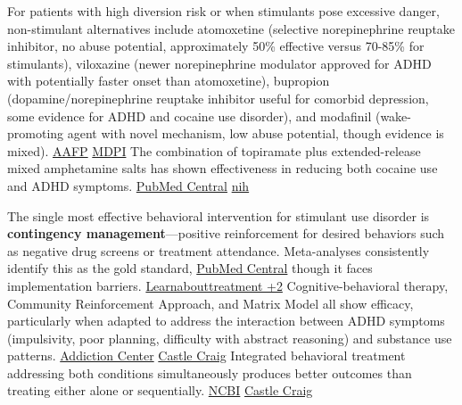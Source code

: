 For patients with high diversion risk or when stimulants pose excessive danger, non-stimulant alternatives include atomoxetine (selective norepinephrine reuptake inhibitor, no abuse potential, approximately 50\% effective versus 70-85\% for stimulants), viloxazine (newer norepinephrine modulator approved for ADHD with potentially faster onset than atomoxetine), bupropion (dopamine/norepinephrine reuptake inhibitor useful for comorbid depression, some evidence for ADHD and cocaine use disorder), and modafinil (wake-promoting agent with novel mechanism, low abuse potential, though evidence is mixed). \href{https://www.aafp.org/family-physician/patient-care/prevention-wellness/emotional-wellbeing/adhd-toolkit/treatment-and-management.html}{AAFP} \href{https://www.mdpi.com/2077-0383/12/9/3096}{MDPI} The combination of topiramate plus extended-release mixed amphetamine salts has shown effectiveness in reducing both cocaine use and ADHD symptoms. \href{https://pmc.ncbi.nlm.nih.gov/articles/PMC2676785/}{PubMed Central} \href{https://pmc.ncbi.nlm.nih.gov/articles/PMC4227391/}{nih}

The single most effective behavioral intervention for stimulant use disorder is \textbf{contingency management}---positive reinforcement for desired behaviors such as negative drug screens or treatment attendance. Meta-analyses consistently identify this as the gold standard, \href{https://pmc.ncbi.nlm.nih.gov/articles/PMC7302911/}{PubMed Central} though it faces implementation barriers. \href{https://www.learnabouttreatment.org/treatment/treatment-for-stimulant-use-disorder/}{Learnabouttreatment +2} Cognitive-behavioral therapy, Community Reinforcement Approach, and Matrix Model all show efficacy, particularly when adapted to address the interaction between ADHD symptoms (impulsivity, poor planning, difficulty with abstract reasoning) and substance use patterns. \href{https://www.addictioncenter.com/dual-diagnosis/adhd/}{Addiction Center} \href{https://www.castlecraig.co.uk/dual-diagnosis/adhd/}{Castle Craig} Integrated behavioral treatment addressing both conditions simultaneously produces better outcomes than treating either alone or sequentially. \href{https://www.ncbi.nlm.nih.gov/books/NBK601490/}{NCBI} \href{https://www.castlecraig.co.uk/dual-diagnosis/adhd/}{Castle Craig}

